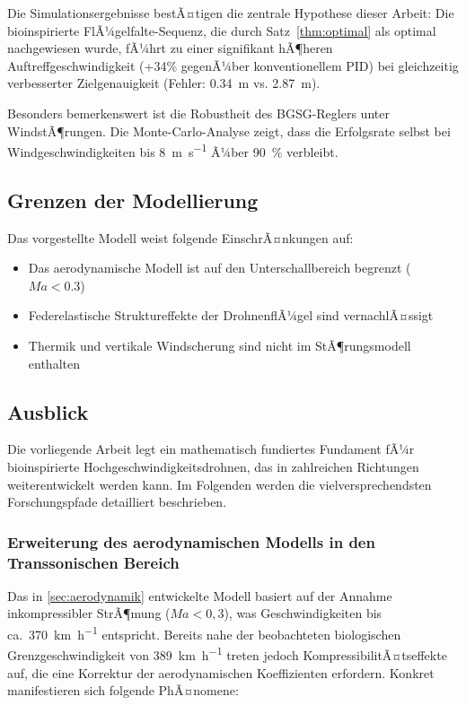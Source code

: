 ﻿\documentclass[12pt,a4paper]{article}
\theoremstyle{remark}
\begin{document}
	Die Simulationsergebnisse bestÃ¤tigen die zentrale Hypothese dieser Arbeit: Die bioinspirierte FlÃ¼gelfalte-Sequenz, die durch Satz~\ref{thm:optimal} als optimal nachgewiesen wurde, fÃ¼hrt zu einer signifikant hÃ¶heren Auftreffgeschwindigkeit (+34\% gegenÃ¼ber konventionellem PID) bei gleichzeitig verbesserter Zielgenauigkeit (Fehler: 0.34~m vs. 2.87~m).
	
	Besonders bemerkenswert ist die Robustheit des BGSG-Reglers unter WindstÃ¶rungen. Die Monte-Carlo-Analyse zeigt, dass die Erfolgsrate selbst bei Windgeschwindigkeiten bis \SI{8}{\m\per\second} Ã¼ber \SI{90}{\percent} verbleibt.
	
	\subsection{Grenzen der Modellierung}
	
	Das vorgestellte Modell weist folgende EinschrÃ¤nkungen auf:
	\begin{itemize}
		\item Das aerodynamische Modell ist auf den Unterschallbereich begrenzt ($Ma < 0.3$)
		\item Federelastische Struktureffekte der DrohnenflÃ¼gel sind vernachlÃ¤ssigt
		\item Thermik und vertikale Windscherung sind nicht im StÃ¶rungsmodell enthalten
	\end{itemize}
	
	\subsection{Ausblick}
	\label{sec:ausblick}

	Die vorliegende Arbeit legt ein mathematisch fundiertes Fundament fÃ¼r bioinspirierte Hochgeschwindigkeitsdrohnen, das in zahlreichen Richtungen weiterentwickelt werden kann. Im Folgenden werden die vielversprechendsten Forschungspfade detailliert beschrieben.

	\subsubsection{Erweiterung des aerodynamischen Modells in den Transsonischen Bereich}

	Das in \cref{sec:aerodynamik} entwickelte Modell basiert auf der Annahme inkompressibler StrÃ¶mung ($Ma < 0{,}3$), was Geschwindigkeiten bis ca.\ \SI{370}{\km\per\hour} entspricht. Bereits nahe der beobachteten biologischen Grenzgeschwindigkeit von \SI{389}{\km\per\hour} treten jedoch KompressibilitÃ¤tseffekte auf, die eine Korrektur der aerodynamischen Koeffizienten erfordern. Konkret manifestieren sich folgende PhÃ¤nomene:
\end{document}
